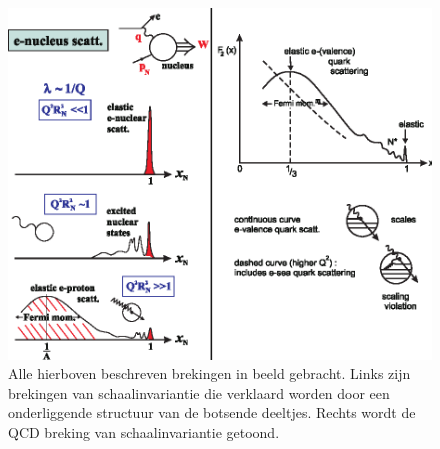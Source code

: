 \documentclass[a4paper,11pt]{article}
\numberwithin{equation}{section} %
\begin{document}
\begin{figure} [H]
  \begin{center}
    \includegraphics[width=.66\textwidth]{Afbeeldingen/ScalingViolations.eps}
    \caption{Alle hierboven beschreven brekingen in beeld gebracht. Links zijn brekingen van schaalinvariantie die verklaard worden door een onderliggende structuur van de botsende deeltjes. Rechts wordt de QCD breking van schaalinvariantie getoond. \cite{Martin}}
   \label{fig:ScalingViolations}
  \end{center}
\end{figure}
\end{document}
